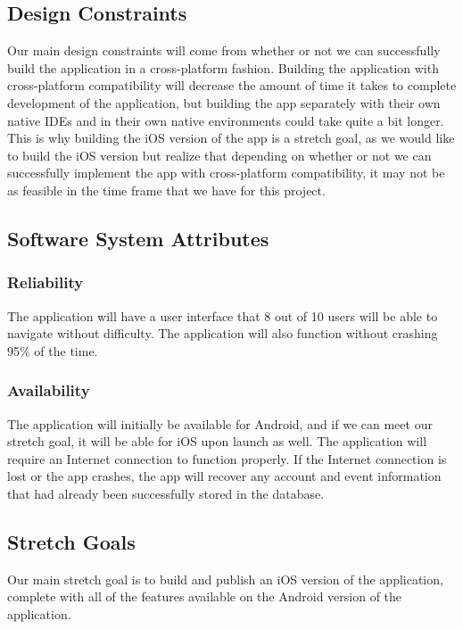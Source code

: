 \documentclass[draftclsnofoot, onecolumn, 10pt, compsoc]{IEEEtran}
\begin{document}
		\subsection{Design Constraints}
			Our main design constraints will come from whether or not we can successfully build the application in a cross-platform fashion. Building the application with cross-platform compatibility will decrease the amount of time it takes to complete development of the application, but building the app separately with their own native IDEs and in their own native environments could take quite a bit longer. This is why building the iOS version of the app is a stretch goal, as we would like to build the iOS version but realize that depending on whether or not we can successfully implement the app with cross-platform compatibility, it may not be as feasible in the time frame that we have for this project.
		
		\subsection{Software System Attributes}
			\subsubsection{Reliability}
				The application will have a user interface that 8 out of 10 users will be able to navigate without difficulty. The application will also function without crashing 95\% of the time.
			
			\subsubsection{Availability}
				The application will initially be available for Android, and if we can meet our stretch goal, it will be able for iOS upon launch as well. The application will require an Internet connection to function properly. If the Internet connection is lost or the app crashes, the app will recover any account and event information that had already been successfully stored in the database.
			
			
			
		
		\subsection{Stretch Goals}
			Our main stretch goal is to build and publish an iOS version of the application, complete with all of the features available on the Android version of the application.
	
\end{document}
